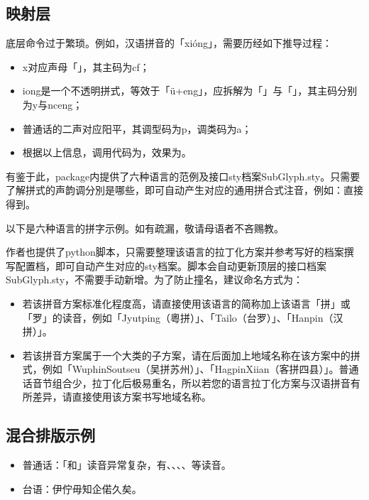 \subsection{映射层}
底层命令过于繁琐。例如，汉语拼音的「xióng」，需要历经如下推导过程：
\begin{itemize}
	\item x对应声母「」，其主码为cf；
	\item iong是一个不透明拼式，等效于「ü+eng」，应拆解为「」与「」，其主码分别为y与nceng；
	\item 普通话的二声对应阳平，其调型码为p，调类码为a；
	\item 根据以上信息，调用代码为，效果为。
\end{itemize}
有鉴于此，package内提供了六种语言的范例及接口sty档案SubGlyph.sty。只需要了解拼式的声韵调分別是哪些，即可自动产生对应的通用拼合式注音，例如：直接得到。\par
以下是六种语言的拼字示例。如有疏漏，敬请母语者不吝赐教。\par
%
作者也提供了python脚本，只需要整理该语言的拉丁化方案并参考写好的档案撰写配置档，即可自动产生对应的sty档案。脚本会自动更新顶层的接口档案SubGlyph.sty，不需要手动新增\detokenize{\usepackage{SGYoursystem.sty}}。为了防止撞名，建议命名方式为：\par
\begin{itemize}
	\item 若该拼音方案标准化程度高，请直接使用该语言的简称加上该语言「拼」或「罗」的读音，例如「Jyutping（粵拼）」、「Tailo（台罗）」、「Hanpin（汉拼）」。
	\item 若该拼音方案属于一个大类的子方案，请在后面加上地域名称在该方案中的拼式，例如「WuphinSoutseu（吴拼苏州）」、「HagpinXiian（客拼四县）」。普通话音节组合少，拉丁化后极易重名，所以若您的语言拉丁化方案与汉语拼音有所差异，请直接使用该方案书写地域名称。
\end{itemize}

\subsection{混合排版示例}
\begin{itemize}
	\item 普通话：「和」读音异常复杂，有、、、、等读音。
	\item 台语：伊佇毋知企偌久矣。
\end{itemize}

\clearpage